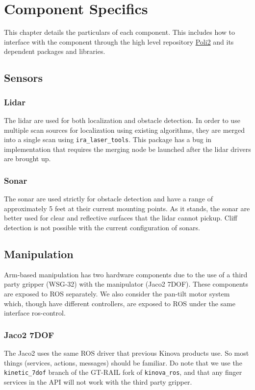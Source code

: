 \chapter{Component Specifics}\label{ch:componentspecifics}
This chapter details the particulars of each component. This includes how to interface with the component through the high level repository \href{https://github.com/si-machines/poli2}{Poli2} and its dependent packages and libraries. 

\section{Sensors}
\subsection{Lidar}
The lidar are used for both localization and obstacle detection. 
In order to use multiple scan sources for localization using existing algorithms, they are merged into a single scan using \texttt{ira\_laser\_tools}. 
This package has a bug in implementation that requires the merging node be launched after the lidar drivers are brought up. \\

\subsection{Sonar}
The sonar are used strictly for obstacle detection and have a range of approximately 5 feet at their current mounting points. 
As it stands, the sonar are better used for clear and reflective surfaces that the lidar cannot pickup. 
Cliff detection is not possible with the current configuration of sonars.

\section{Manipulation}
Arm-based manipulation has two hardware components due to the use of a third party gripper (WSG-32) with the manipulator (Jaco2 7DOF). These components are exposed to ROS separately. We also consider the pan-tilt motor system which, though have different controllers, are exposed to ROS under the same interface ros-control. 

\subsection{Jaco2 7DOF}
The Jaco2 uses the same ROS driver that previous Kinova products use. So most things (services, actions, messages) should be familiar. 
Do note that we use the \texttt{kinetic\_7dof} branch of the GT-RAIL fork of \texttt{kinova\_ros}, and that any finger services in the API will not work with the third party gripper.


